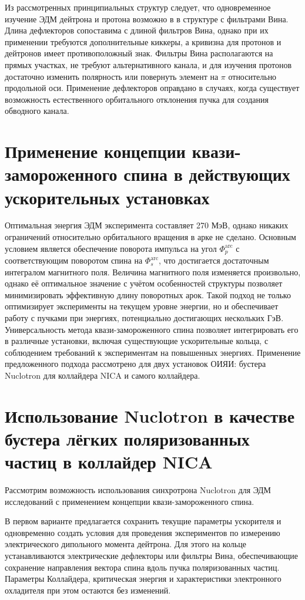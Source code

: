 \par  Из рассмотренных принципиальных структур следует, что одновременное изучение ЭДМ дейтрона и протона возможно в в структуре с фильтрами Вина. Длина дефлекторов сопоставима с длиной фильтров Вина, однако при их применении требуются дополнительные киккеры, а кривизна для протонов и дейтронов имеет противоположный знак. Фильтры Вина располагаются на прямых участках, не требуют альтернативного канала, и для изучения протонов достаточно изменить полярность или повернуть элемент на $\pi$ относительно продольной оси. Применение дефлекторов оправдано в случаях, когда существует возможность естественного орбитального отклонения пучка для создания обводного канала.

	\section{Применение концепции квази-замороженного спина в действующих ускорительных установках}\label{sec:EDM/nuclotron}

\par Оптимальная энергия ЭДМ эксперимента составляет 270 МэВ, однако никаких ограничений относительно орбитального вращения в арке не сделано. Основным условием является обеспечение поворота импульса на угол $\Phi_p^{\textrm{arc}}$ с соответствующим поворотом спина на $\Phi_s^{\textrm{arc}}$, что достигается достаточным интегралом магнитного поля. Величина магнитного поля изменяется произвольно, однако её оптимальное значение с учётом особенностей структуры позволяет минимизировать эффективную длину поворотных арок. Такой подход не только оптимизирует эксперименты на текущем уровне энергии, но и обеспечивает работу с пучками при энергиях, потенциально достигающих нескольких ГэВ. Универсальность метода квази-замороженного спина позволяет интегрировать его в различные установки, включая существующие ускорительные кольца, с соблюдением требований к экспериментам на повышенных энергиях. Применение предложенного подхода рассмотрено для двух установок ОИЯИ: бустера Nuclotron для коллайдера NICA и самого коллайдера.

	\section{Использование Nuclotron в качестве бустера лёгких поляризованных частиц в коллайдер NICA}\label{sec:EDM/nuclotron}

\par Рассмотрим возможность использования синхротрона Nuclotron для ЭДМ исследований с применением концепции квази-замороженного спина.
\par В первом варианте предлагается сохранить текущие параметры ускорителя и одновременно создать условия для проведения экспериментов по измерению электрического дипольного момента дейтрона. Для этого на кольце устанавливаются электрические дефлекторы или фильтры Вина, обеспечивающие сохранение направления вектора спина вдоль пучка поляризованных частиц. Параметры Коллайдера, критическая энергия и характеристики электронного охладителя при этом остаются без изменений.


